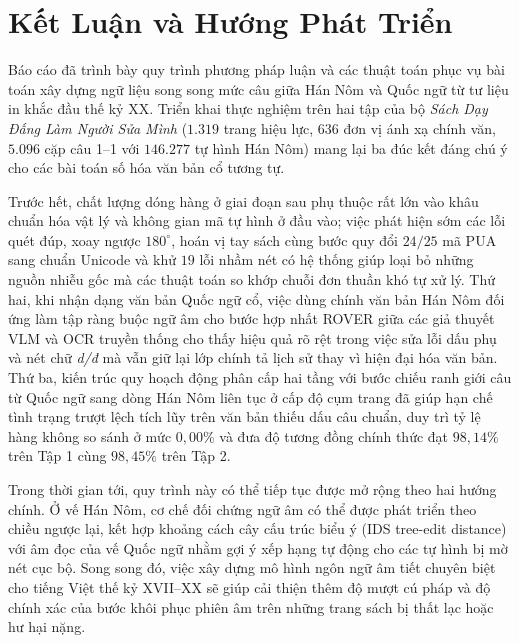 \section{Kết Luận và Hướng Phát Triển}

Báo cáo đã trình bày quy trình phương pháp luận và các thuật toán phục vụ bài toán xây dựng ngữ liệu song song mức câu giữa Hán Nôm và Quốc ngữ từ tư liệu in khắc đầu thế kỷ XX. Triển khai thực nghiệm trên hai tập của bộ \textit{Sách Dạy Đấng Làm Người Sửa Mình} ($1.319$ trang hiệu lực, $636$ đơn vị ánh xạ chính văn, $5.096$ cặp câu 1--1 với $146.277$ tự hình Hán Nôm) mang lại ba đúc kết đáng chú ý cho các bài toán số hóa văn bản cổ tương tự.

Trước hết, chất lượng dóng hàng ở giai đoạn sau phụ thuộc rất lớn vào khâu chuẩn hóa vật lý và không gian mã tự hình ở đầu vào; việc phát hiện sớm các lỗi quét đúp, xoay ngược $180^\circ$, hoán vị tay sách cùng bước quy đổi $24/25$ mã PUA sang chuẩn Unicode và khử $19$ lỗi nhầm nét có hệ thống giúp loại bỏ những nguồn nhiễu gốc mà các thuật toán so khớp chuỗi đơn thuần khó tự xử lý. Thứ hai, khi nhận dạng văn bản Quốc ngữ cổ, việc dùng chính văn bản Hán Nôm đối ứng làm tập ràng buộc ngữ âm cho bước hợp nhất ROVER giữa các giả thuyết VLM và OCR truyền thống cho thấy hiệu quả rõ rệt trong việc sửa lỗi dấu phụ và nét chữ \textit{d/đ} mà vẫn giữ lại lớp chính tả lịch sử thay vì hiện đại hóa văn bản. Thứ ba, kiến trúc quy hoạch động phân cấp hai tầng với bước chiếu ranh giới câu từ Quốc ngữ sang dòng Hán Nôm liên tục ở cấp độ cụm trang đã giúp hạn chế tình trạng trượt lệch tích lũy trên văn bản thiếu dấu câu chuẩn, duy trì tỷ lệ hàng không so sánh ở mức $0{,}00\%$ và đưa độ tương đồng chính thức đạt $98{,}14\%$ trên Tập 1 cùng $98{,}45\%$ trên Tập 2.

Trong thời gian tới, quy trình này có thể tiếp tục được mở rộng theo hai hướng chính. Ở vế Hán Nôm, cơ chế đối chứng ngữ âm có thể được phát triển theo chiều ngược lại, kết hợp khoảng cách cây cấu trúc biểu ý (IDS tree-edit distance) với âm đọc của vế Quốc ngữ nhằm gợi ý xếp hạng tự động cho các tự hình bị mờ nét cục bộ. Song song đó, việc xây dựng mô hình ngôn ngữ âm tiết chuyên biệt cho tiếng Việt thế kỷ XVII--XX sẽ giúp cải thiện thêm độ mượt cú pháp và độ chính xác của bước khôi phục phiên âm trên những trang sách bị thất lạc hoặc hư hại nặng.
